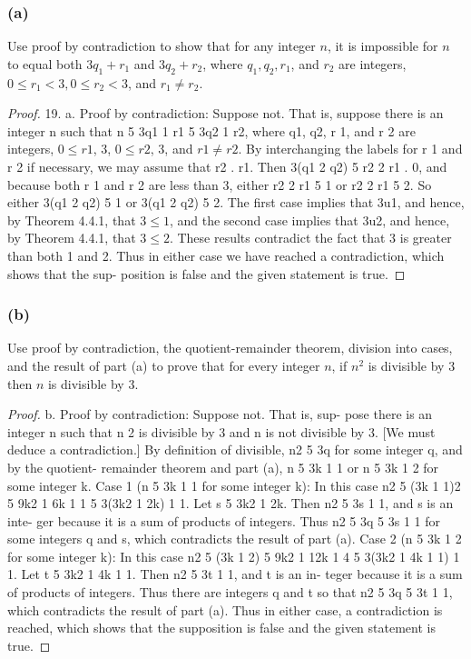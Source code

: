 \documentclass[14pt]{extarticle}
\begin{document}
\subsubsection{(a)}
Use proof by contradiction to show that for any integer $n$, it is impossible for $n$ to equal both $3q_1 + r_1$ and $3q_2 + r_2$, where $q_1, q_2, r_1$, and $r_2$ are integers, $0 \leq r_1 < 3, 0 \leq r_2 < 3$, and $r_1 \neq r_2$.

\begin{proof}
19. a. Proof by contradiction: Suppose not. That
is, suppose there is an integer n such that
n 5 3q1 1 r1 5 3q2 1 r2, where q1, q2, r 1, and
r 2 are integers, $0 \leq r1$, 3, $0 \leq r2$, 3, and
$r1 \neq r2$. By interchanging the labels for r 1 and r 2
if necessary, we may assume that r2 . r1. Then
3(q1 2 q2) 5 r2 2 r1 . 0, and because both r 1 and
r 2 are less than 3, either r2 2 r1 5 1 or r2 2 r1 5 2.
So either 3(q1 2 q2) 5 1 or 3(q1 2 q2) 5 2. The
first case implies that 3u1, and hence, by Theorem
4.4.1, that $3 \leq 1$, and the second case implies that
3u2, and hence, by Theorem 4.4.1, that $3 \leq 2$.
These results contradict the fact that 3 is greater
than both 1 and 2. Thus in either case we have
reached a contradiction, which shows that the sup-
position is false and the given statement is true.

\end{proof}

\subsubsection{(b)}
Use proof by contradiction, the quotient-remainder theorem, division into cases, and the result of part (a) to prove that for every integer $n$, if $n^2$ is divisible by 3 then $n$ is divisible by 3.

\begin{proof}
b. Proof by contradiction: Suppose not. That is, sup-
pose there is an integer n such that n 2 is divisible
by 3 and n is not divisible by 3. [We must deduce
a contradiction.] By definition of divisible,
n2 5 3q for some integer q, and by the quotient-
remainder theorem and part (a), n 5 3k 1 1 or
n 5 3k 1 2 for some integer k.
Case 1 (n 5 3k 1 1 for some integer k): In this case
n2 5 (3k 1 1)2 5 9k2 1 6k 1 1 5 3(3k2 1 2k) 1 1.
Let s 5 3k2 1 2k. Then n2 5 3s 1 1, and s is an inte-
ger because it is a sum of products of integers. Thus
n2 5 3q 5 3s 1 1 for some integers q and s, which
contradicts the result of part (a).
Case 2 (n 5 3k 1 2 for some integer k): In this case
n2 5 (3k 1 2) 5 9k2 1 12k 1 4 5 3(3k2 1 4k 1 1) 1 1.
Let t 5 3k2 1 4k 1 1. Then n2 5 3t 1 1, and t is an in-
teger because it is a sum of products of integers. Thus
there are integers q and t so that n2 5 3q 5 3t 1 1,
which contradicts the result of part (a).
Thus in either case, a contradiction is reached,
which shows that the supposition is false and the
given statement is true.
\end{proof}
\end{document}
